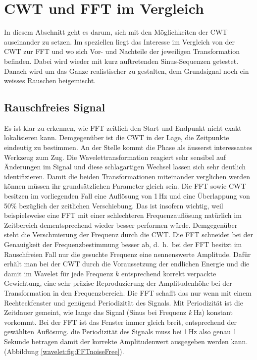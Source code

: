 %
%
%
%
\section{CWT und FFT im Vergleich
\label{wavelets:section:teil4}}

In diesem Abschnitt geht es darum, sich mit den Möglichkeiten der
CWT auseinander zu setzen.
Im speziellen liegt das Interesse im Vergleich von der CWT zur FFT
und wo sich Vor- und Nachteile der jeweiligen Transformation befinden.
Dabei wird wieder mit kurz auftretenden Sinus-Sequenzen getestet.
Danach wird um das Ganze realistischer zu gestalten, dem Grundsignal
noch ein weisses Rauschen beigemischt.

\subsection{Rauschfreies Signal
	\label{wavelets:subsection:CWTvsFFTRauschfrei}}
Es ist klar zu erkennen, wie FFT zeitlich den Start und Endpunkt
nicht exakt lokalisieren kann.
Demgegenüber ist die CWT in der Lage, die Zeitpunkte eindeutig zu
bestimmen.
An der Stelle kommt die Phase als äusserst interessantes Werkzeug
zum Zug.
Die Wavelettransformation reagiert sehr sensibel auf Änderungen im
Signal und diese schlagartigen Wechsel lassen sich sehr deutlich
identifizieren.
Damit die beiden Transformationen miteinander verglichen werden
können müssen ihr grundsätzlichen Parameter gleich sein.
Die FFT sowie CWT besitzen im vorliegenden Fall eine Auflösung von
1\,Hz und eine Überlappung von 50\% bezüglich der zeitlichen Verschiebung.
Das ist insofern wichtig, weil beispielsweise eine FFT mit einer
schlechteren Frequenzauflösung natürlich im Zeitbereich dementsprechend
wieder besser performen würde.
Demgegenüber steht die Verschmierung der Frequenz durch die CWT.
Die FFT schneidet bei der Genauigkeit der Frequenzbestimmung besser
ab, d.~h.~bei der FFT besitzt im Rauschfreien Fall nur die gesuchte
Frequenz eine nennenswerte Amplitude.
Dafür erhält man bei der CWT durch die Voraussetzung der endlichen
Energie und die damit im Wavelet für jede Frequenz $k$ entsprechend
korrekt verpackte Gewichtung, eine sehr präzise Reproduzierung der
Amplitudenhöhe bei der Transformation in den Frequenzbereich.
Die FFT schafft das nur wenn mit einem Rechteckfenster und genügend
Periodizität des Signals.
Mit Periodizität ist die Zeitdauer gemeint, wie lange das Signal
(Sinus bei Frequenz $k\,$Hz) konstant vorkommt.
Bei der FFT ist das Fenster immer gleich breit, entsprechend der
gewählten Auflösung.
die Periodizität des Signals muss bei 1\,Hz also genau 1 Sekunde
betragen damit der korrekte Amplitudenwert ausgegeben werden
kann.(Abbildung \ref{wavelet:fig:FFTnoiseFree}).

